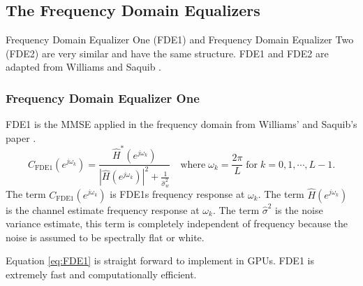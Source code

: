 \clearpage
\subsection{The Frequency Domain Equalizers}
\label{sec:FDE}
Frequency Domain Equalizer One (FDE1) and Frequency Domain Equalizer Two (FDE2) are very similar and have the same structure.
FDE1 and FDE2 are adapted from Williams and Saquib \cite[eq. (11) and (12)]{williams2013linear} \cite{coon2006channel}.

\subsubsection{Frequency Domain Equalizer One}
FDE1 is the MMSE applied in the frequency domain from Williams' and Saquib's paper \cite[eq. (11)]{williams2013linear}.
\begin{equation}
C_\text{FDE1}(e^{j\omega_k}) = \frac{\hat{H}^\ast(e^{j\omega_k})}  {|\hat{H}(e^{j\omega_k})|^2  +  \frac{1}{\hat{\sigma}^2_w}} \quad
\text{where} \;
\omega_k = \frac{2\pi}{L} \;
\text{for} \;
k=0,1,\cdots,L-1.
\label{eq:FDE1}
\end{equation}
The term $C_\text{FDE1}(e^{j\omega_k})$ is FDE1s frequency response at $\omega_k$.
The term $\hat{H}(e^{j\omega_k})$ is the channel estimate frequency response at $\omega_k$.
The term $\hat{\sigma}^2$ is the noise variance estimate, this term is completely independent of frequency because the noise is assumed to be spectrally flat or white.

Equation \eqref{eq:FDE1} is straight forward to implement in GPUs.
FDE1 is extremely fast and computationally efficient.

